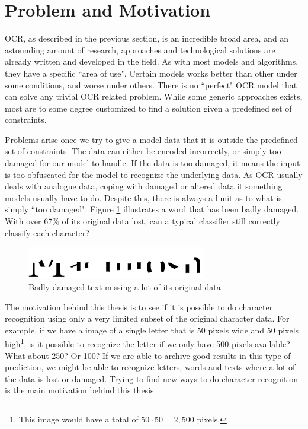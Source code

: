 
\section{Problem and Motivation}
\label{sec:problem_motivation}
OCR, as described in the previous section, is an incredible broad area, and an astounding amount of research, approaches and technological solutions are already written and developed in the field. As with most models and algorithms, they have a specific ``area of use". Certain models works better than other under some conditions, and worse under others. There is no ``perfect" OCR model that can solve any trivial OCR related problem. While some generic approaches exists, most are to some degree customized to find a solution given a predefined set of constraints.

Problems arise once we try to give a model data that it is outside the predefined set of constraints. The data can either be encoded incorrectly, or simply too damaged for our model to handle. If the data is too damaged, it means the input is too obfuscated for the model to recognize the underlying data. As OCR usually deals with analogue data, coping with damaged or altered data it something models usually have to do. Despite this, there is always a limit as to what is simply ``too damaged". Figure \ref{fig:damaged-text} illustrates a word that has been badly damaged. With over 67\% of its original data lost, can a typical classifier still correctly classify each character?

\begin{figure}[ht]
    \centering
    \includegraphics[width=0.7\textwidth]{fig/chapter1/damaged.png}
    \caption{Badly damaged text missing a lot of its original data}
    \label{fig:damaged-text}
\end{figure}

The motivation behind this thesis is to see if it is possible to do character recognition using only a very limited subset of the original character data. For example, if we have a image of a single letter that is 50 pixels wide and 50 pixels high\footnote{This image would have a total of $50 \cdot 50 = 2,500$ pixels.}, is it possible to recognize the letter if we only have 500 pixels available? What about 250? Or 100? If we are able to archive good results in this type of prediction, we might be able to recognize letters, words and texts where a lot of the data is lost or damaged. Trying to find new ways to do character recognition is the main motivation behind this thesis.

